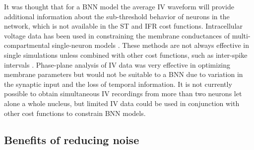 \smallskip{}

It was thought that for a BNN model the average IV waveform will provide
additional information about the sub-threshold behavior of neurons in the
network, which is not available in the ST and IFR cost functions.
Intracellular voltage data has been used in constraining the membrane
conductances of multi-compartmental single-neuron models
\cite{Le_Masson:2000,KerenPeledEtAl:2005}.  These methods are not always
effective in single simulations unless combined with other cost functions,
such as inter-spike intervals \citep{KerenPeledEtAl:2005}. Phase-plane
analysis of IV data was very effective in optimizing membrane parameters
\citep{VanDeEtAl:2008,KerenPeledEtAl:2005} but would not be suitable to a
BNN due to variation in the synaptic input and the loss of temporal
information.  It is not currently possible to obtain simultaneous IV
recordings from more than two neurons let alone a whole nucleus, but
limited IV data could be used in conjunction with other cost functions to
constrain BNN models.

\subsection{Benefits of reducing noise}\label{sec:GA:benef-reduc-noise}

\smallskip{} 


\smallskip{}


